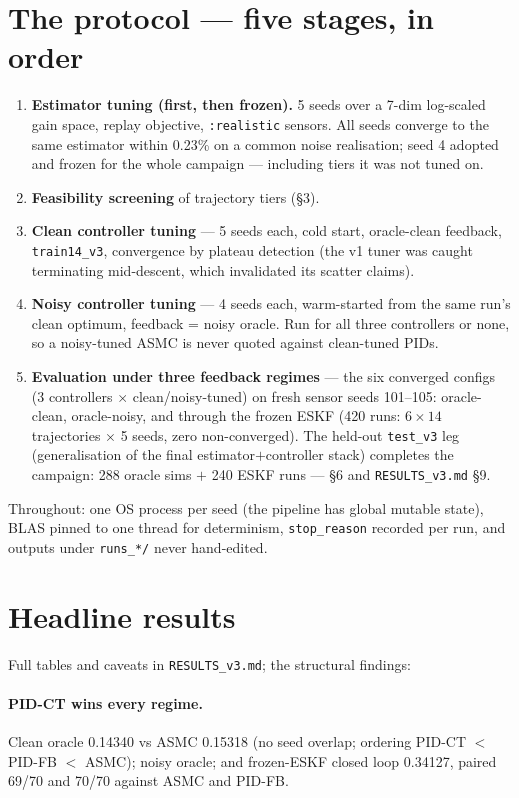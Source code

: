 \documentclass[11pt]{article}
\begin{document}
\section{The protocol --- five stages, in order}
\begin{enumerate}[nosep]
\item \textbf{Estimator tuning (first, then frozen).} 5 seeds over a 7-dim log-scaled
      gain space, replay objective, \texttt{:realistic} sensors. All seeds converge to
      the same estimator within 0.23\% on a common noise realisation; seed 4 adopted and
      frozen for the whole campaign --- including tiers it was not tuned on.
\item \textbf{Feasibility screening} of trajectory tiers (\S3).
\item \textbf{Clean controller tuning} --- 5 seeds each, cold start, oracle-clean
      feedback, \texttt{train14\_v3}, convergence by plateau detection (the v1 tuner was
      caught terminating mid-descent, which invalidated its scatter claims).
\item \textbf{Noisy controller tuning} --- 4 seeds each, warm-started from the same run's
      clean optimum, feedback = noisy oracle. Run for all three controllers or none, so
      a noisy-tuned ASMC is never quoted against clean-tuned PIDs.
\item \textbf{Evaluation under three feedback regimes} --- the six converged configs
      (3 controllers $\times$ clean/noisy-tuned) on fresh sensor seeds 101--105:
      oracle-clean, oracle-noisy, and through the frozen ESKF (420 runs: $6\times14$
      trajectories $\times$ 5 seeds, zero non-converged). The held-out
      \texttt{test\_v3} leg (generalisation of the final estimator$+$controller stack)
      completes the campaign: 288 oracle sims $+$ 240 ESKF runs --- \S6 and
      \texttt{RESULTS\_v3.md} \S9.
\end{enumerate}
Throughout: one OS process per seed (the pipeline has global mutable state), BLAS pinned
to one thread for determinism, \texttt{stop\_reason} recorded per run, and outputs under
\texttt{runs\_*/} never hand-edited.

\section{Headline results}
Full tables and caveats in \texttt{RESULTS\_v3.md}; the structural findings:

\paragraph{PID-CT wins every regime.} Clean oracle 0.14340 vs ASMC 0.15318 (no seed
overlap; ordering PID-CT $<$ PID-FB $<$ ASMC); noisy oracle; and frozen-ESKF closed loop
0.34127, paired 69/70 and 70/70 against ASMC and PID-FB.
\end{document}
